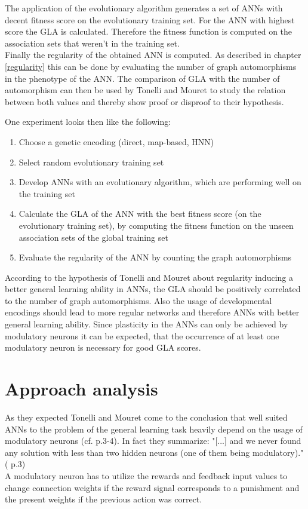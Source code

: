 \documentclass[12pt,twoside]{article}
\theoremstyle{plain}
\theoremstyle{definition}
\theoremstyle{remark}
\begin{document}
The application of the evolutionary algorithm generates a set of ANNs with decent fitness score on the evolutionary training set. For the ANN with highest score the GLA is calculated. Therefore the fitness function is computed on the association sets that weren't in the training set.\\
Finally the regularity of the obtained ANN is computed. As described in chapter \ref{regularity} this can be done by evaluating the number of graph automorphisms in the phenotype of the ANN. The comparison of GLA with the number of automorphism can then be used by Tonelli and Mouret to study the relation between both values and  thereby show proof or disproof to their hypothesis. \medskip

One experiment looks then like the following:
\begin{enumerate}
	\item Choose a genetic encoding (direct, map-based, HNN)
	\item Select random evolutionary training set
	\item Develop ANNs with an evolutionary algorithm, which are performing well on the training set
	\item Calculate the GLA of the ANN with the best fitness score (on the evolutionary training set), by computing the fitness function on the unseen association sets of the global training set
	\item Evaluate the regularity of the ANN by counting the graph automorphisms
\end{enumerate}

According to the hypothesis of Tonelli and Mouret about regularity inducing a better general learning ability in ANNs, the GLA should be positively correlated to the number of graph automorphisms. 
Also the usage of developmental encodings should lead to more regular networks and therefore ANNs with better general learning ability.
Since plasticity in the ANNs can only be achieved by modulatory neurons it can be expected, that the occurrence of at least one modulatory neuron is necessary for good GLA scores. 

\section{Approach analysis}
\label{sec:analysis}
As they expected Tonelli and Mouret come to the conclusion that well suited ANNs to the problem of the general learning task heavily depend on the usage of modulatory neurons (cf. \cite{citeulike:12788284} p.3-4). In fact they summarize: "[...] and we never found any solution with less than two hidden neurons (one of them being modulatory)." (\cite{citeulike:12788284} p.3)\\
A modulatory neuron has to utilize the rewards and feedback input values to change connection weights if the reward signal corresponds to a punishment and  the present weights if the previous action was correct.\medskip
\end{document}
